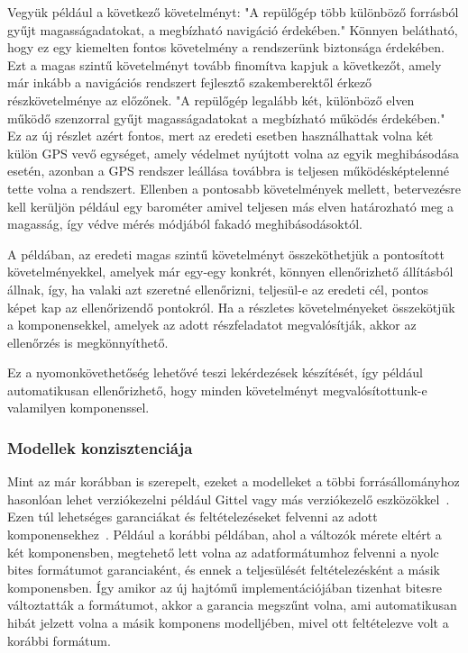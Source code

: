         Vegyük például a következő követelményt: "A repülőgép több különböző forrásból gyűjt magasságadatokat, a megbízható navigáció érdekében."
        Könnyen belátható, hogy ez egy kiemelten fontos követelmény a rendszerünk biztonsága érdekében. Ezt a magas szintű követelményt tovább finomítva kapjuk a következőt, amely már inkább a navigációs rendszert fejlesztő szakemberektől érkező részkövetelménye az előzőnek. "A repülőgép legalább két, különböző elven működő szenzorral gyűjt magasságadatokat a megbízható működés érdekében." Ez az új részlet azért fontos, mert az eredeti esetben használhattak volna két külön GPS vevő egységet, amely védelmet nyújtott volna az egyik meghibásodása esetén, azonban a GPS rendszer leállása továbbra is teljesen működésképtelenné tette volna a rendszert. Ellenben a pontosabb követelmények mellett, betervezésre kell kerüljön például egy barométer amivel teljesen más elven határozható meg a magasság, így védve mérés módjából fakadó meghibásodásoktól.
        
        A példában, az eredeti magas szintű követelményt összeköthetjük a pontosított követelményekkel, amelyek már egy-egy konkrét, könnyen ellenőrizhető állításból állnak, így, ha valaki azt szeretné ellenőrizni, teljesül-e az eredeti cél, pontos képet kap az ellenőrizendő pontokról. Ha a részletes követelményeket összekötjük a komponensekkel, amelyek az adott részfeladatot megvalósítják, akkor az ellenőrzés is megkönnyíthető.
        
        Ez a nyomonkövethetőség lehetővé teszi lekérdezések készítését, így például automatikusan ellenőrizhető, hogy minden követelményt megvalósítottunk-e valamilyen komponenssel.

        \subsubsection{Modellek konzisztenciája}
        Mint az már korábban is szerepelt, ezeket a modelleket a többi forrásállományhoz hasonlóan lehet verziókezelni például Gittel vagy más verziókezelő eszközökkel~\cite{Git2024, LieberLieber2024}.
        Ezen túl lehetséges garanciákat és feltételezéseket felvenni az adott komponensekhez~\cite{Bajaj_2022}. Például a korábbi példában, ahol a változók mérete eltért a két komponensben, megtehető lett volna az adatformátumhoz felvenni a nyolc bites formátumot garanciaként, és ennek a teljesülését feltételezésként a másik komponensben.
        Így amikor az új hajtómű implementációjában tizenhat bitesre változtatták a formátumot, akkor a garancia megszűnt volna, ami automatikusan hibát jelzett volna a másik komponens modelljében, mivel ott feltételezve volt a korábbi formátum.

